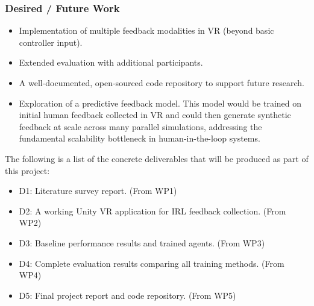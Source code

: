 \documentclass[rnd]{mas_proposal}
\begin{document}
\subsubsection*{Desired / Future Work}
\begin{itemize}
    \item Implementation of multiple feedback modalities in VR (beyond basic controller input).
    \item Extended evaluation with additional participants.
    \item A well-documented, open-sourced code repository to support future research.
    \item Exploration of a predictive feedback model. This model would be trained on initial human feedback collected in VR and could then generate synthetic feedback at scale across many parallel simulations, addressing the fundamental scalability bottleneck in human-in-the-loop systems.
\end{itemize}


\noindent The following is a list of the concrete deliverables that will be produced as part of this project:

\begin{itemize}
    \item D1: Literature survey report. (From WP1)
    \item D2: A working Unity VR application for IRL feedback collection. (From WP2)
    \item D3: Baseline performance results and trained agents. (From WP3)
    \item D4: Complete evaluation results comparing all training methods. (From WP4)
    \item D5: Final project report and code repository. (From WP5)
\end{itemize}


\nocite{*}

\end{document}
